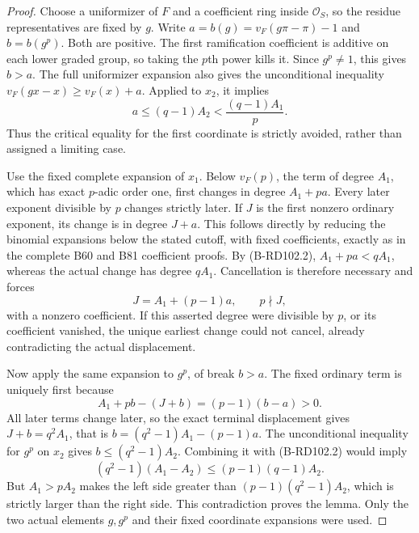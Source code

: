 \begin{proof}
Choose a uniformizer of $F$ and a coefficient ring
inside $\mathcal O_S$, so the residue representatives
are fixed by $g$. Write
$a=b(g)=v_F(g\pi-\pi)-1$ and
$b=b(g^p)$. Both are positive.
The first ramification coefficient is additive on
each lower graded group, so taking the $p$th power
kills it. Since $g^p\ne1$, this gives $b>a$.
The full uniformizer expansion also gives the
unconditional inequality
$v_F(gx-x)\ge v_F(x)+a$.
Applied to $x_2$, it implies
\[
                a\le(q-1)A_2<\frac{(q-1)A_1}{p}.
                                                        \tag{B-RD102.2}
\]
Thus the critical equality for the first coordinate
is strictly avoided, rather than assigned a limiting case.

Use the fixed complete expansion of $x_1$.
Below $v_F(p)$, the term of degree $A_1$, which has
exact $p$-adic order one, first changes in degree
$A_1+pa$. Every later exponent divisible by $p$
changes strictly later. If $J$ is the first nonzero
ordinary exponent, its change is in degree $J+a$.
This follows directly by reducing the binomial expansions
below the stated cutoff, with fixed coefficients, exactly
as in the complete B60 and B81 coefficient proofs.
By (B-RD102.2), $A_1+pa<qA_1$, whereas the actual
change has degree $qA_1$. Cancellation is therefore
necessary and forces
\[
                     J=A_1+(p-1)a,\qquad p\nmid J ,
                                                        \tag{B-RD102.3}
\]
with a nonzero coefficient. If this asserted degree
were divisible by $p$, or its coefficient vanished,
the unique earliest change could not cancel, already
contradicting the actual displacement.

Now apply the same expansion to $g^p$, of break $b>a$.
The fixed ordinary term is uniquely first because
\[
             A_1+pb-(J+b)=(p-1)(b-a)>0 .
                                                        \tag{B-RD102.4}
\]
All later terms change later, so the exact terminal
displacement gives
$J+b=q^2A_1$, that is
$b=(q^2-1)A_1-(p-1)a$.
The unconditional inequality for $g^p$ on $x_2$
gives $b\le(q^2-1)A_2$. Combining it with (B-RD102.2)
would imply
\[
 (q^2-1)(A_1-A_2)\le(p-1)(q-1)A_2 .
                                                        \tag{B-RD102.5}
\]
But $A_1>pA_2$ makes the left side greater than
$(p-1)(q^2-1)A_2$, which is strictly larger than
the right side. This contradiction proves the lemma.
Only the two actual elements $g,g^p$ and their
fixed coordinate expansions were used.
\end{proof}

